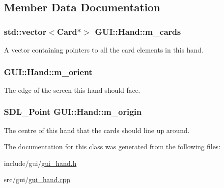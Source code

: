 \subsection{Member Data Documentation}
\hypertarget{classGUI_1_1Hand_a59394b48b5a8f2f4e5aa05306964be35}{
\subsubsection[{m\-\_\-cards}]{\setlength{\rightskip}{0pt plus 5cm}std\-::vector$<${\bf Card}$\ast$$>$ G\-U\-I\-::\-Hand\-::m\-\_\-cards\hspace{0.3cm}{\ttfamily [private]}}}\label{classGUI_1_1Hand_a59394b48b5a8f2f4e5aa05306964be35}


A vector containing pointers to all the card elements in this hand. 

\hypertarget{classGUI_1_1Hand_aeb87f3ac6dd08799f2cbbb3c9444c2c4}{
\subsubsection[{m\-\_\-orient}]{ G\-U\-I\-::\-Hand\-::m\-\_\-orient\hspace{0.3cm}{\ttfamily [private]}}}\label{classGUI_1_1Hand_aeb87f3ac6dd08799f2cbbb3c9444c2c4}


The edge of the screen this hand should face. 

\hypertarget{classGUI_1_1Hand_a5993d2aadd4487e21a030fcbd67ada88}{
\subsubsection[{m\-\_\-origin}]{\setlength{\rightskip}{0pt plus 5cm}S\-D\-L\-\_\-\-Point G\-U\-I\-::\-Hand\-::m\-\_\-origin\hspace{0.3cm}{\ttfamily [private]}}}\label{classGUI_1_1Hand_a5993d2aadd4487e21a030fcbd67ada88}


The centre of this hand that the cards should line up around. 



The documentation for this class was generated from the following files\-:\begin{DoxyCompactItemize}
\item 
include/gui/\hyperlink{gui__hand_8h}{gui\-\_\-hand.\-h}\item 
src/gui/\hyperlink{gui__hand_8cpp}{gui\-\_\-hand.\-cpp}\end{DoxyCompactItemize}
